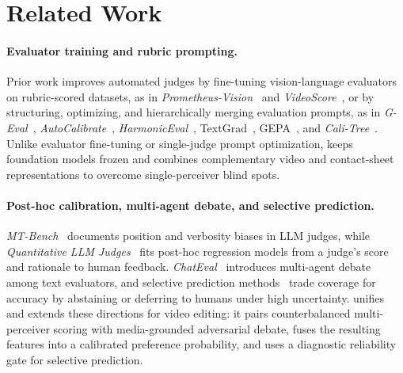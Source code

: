 \section{Related Work}
\label{sec:related}

\paragraph{Evaluator training and rubric prompting.}
Prior work improves automated judges by fine-tuning vision-language evaluators on rubric-scored datasets, as in \textit{Prometheus-Vision}~\cite{prometheusvision} and \textit{VideoScore}~\cite{videoscore}, or by structuring, optimizing, and hierarchically merging evaluation prompts, as in \textit{G-Eval}~\cite{geval}, \textit{AutoCalibrate}~\cite{autocalibrate}, \textit{HarmonicEval}~\cite{harmoniceval}, TextGrad~\cite{textgrad}, GEPA~\cite{gepa}, and \textit{Cali-Tree}~\cite{calitree}. Unlike evaluator fine-tuning or single-judge prompt optimization, \critical keeps foundation models frozen and combines complementary video and contact-sheet representations to overcome single-perceiver blind spots.

\paragraph{Post-hoc calibration, multi-agent debate, and selective prediction.}
\textit{MT-Bench}~\cite{mtbench} documents position and verbosity biases in LLM judges, while \textit{Quantitative LLM Judges}~\cite{quantllmj} fits post-hoc regression models from a judge's score and rationale to human feedback. \textit{ChatEval}~\cite{chateval} introduces multi-agent debate among text evaluators, and selective prediction methods~\cite{geifman2017selective,madras2018predict,kamath2020selective} trade coverage for accuracy by abstaining or deferring to humans under high uncertainty. \critical unifies and extends these directions for video editing: it pairs counterbalanced multi-perceiver scoring with media-grounded adversarial debate, fuses the resulting features into a calibrated preference probability, and uses a diagnostic reliability gate for selective prediction.
